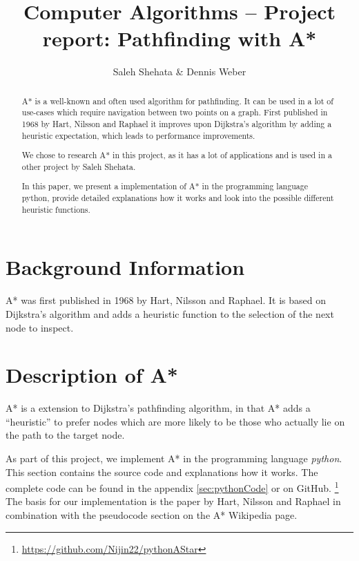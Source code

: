\documentclass[12pt]{article}
\begin{document}
	
\title{Computer Algorithms -- Project report: Pathfinding with A*}
\author{Saleh Shehata \& Dennis Weber}
\maketitle

\begin{abstract}
	A* is a well-known and often used algorithm for pathfinding.
	It can be used in a lot of use-cases which require navigation between two points on a graph.
	First published in 1968 by Hart, Nilsson and Raphael\cite{hartNilssonRaphael} it improves upon Dijkstra's algorithm\cite{Dijkstra1959} by adding a heuristic expectation, which leads to performance improvements.
	
	We chose to research A* in this project, as it has a lot of applications and is used in a other project by Saleh Shehata.
	
	In this paper, we present a implementation of A* in the programming language python, provide detailed explanations how it works and look into the possible different heuristic functions.
\end{abstract}

\newpage

\section{Background Information}
A* was first published in 1968 by Hart, Nilsson and Raphael\cite{hartNilssonRaphael}. It is based on Dijkstra's algorithm\cite{Dijkstra1959} and adds a heuristic function to the selection of the next node to inspect.


\section{Description of A*}
A* is a extension to Dijkstra's pathfinding algorithm\cite{Dijkstra1959}, in that A* adds a \enquote{heuristic} to prefer nodes which are more likely to be those who actually lie on the path to the target node.

As part of this project, we implement A* in the programming language \textit{python}. This section contains the source code and explanations how it works.
The complete code can be found in the appendix \ref{sec:pythonCode} or on GitHub.
\footnote{\url{https://github.com/Nijin22/pythonAStar}}
The basis for our implementation is the paper by Hart, Nilsson and Raphael\cite{hartNilssonRaphael} in combination with the pseudocode section on the A* Wikipedia page.\cite{wiki:astar}
\end{document}
